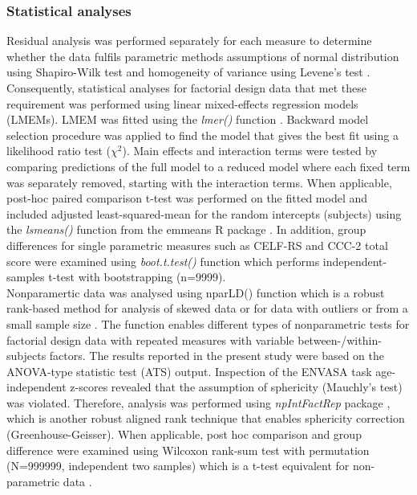 \documentclass[a4paper, twoside]{templates/ociamthesis}
\begin{document}
\hypertarget{statistical-analyses}{%
\subsubsection{Statistical analyses}\label{statistical-analyses}}

Residual analysis was performed separately for each measure to determine whether the data fulfils parametric methods assumptions of normal distribution using Shapiro-Wilk test \autocite[\emph{shapiro.test()},][]{RCore} and homogeneity of variance using Levene's test \autocite[\emph{leveneTest()};][]{carPackageR}. Consequently, statistical analyses for factorial design data that met these requirement was performed using linear mixed-effects regression models (LMEMs). LMEM was fitted using the \emph{lmer()} function \autocite[lme4 package;][]{lme4PackageR}. Backward model selection procedure was applied to find the model that gives the best fit using a likelihood ratio test (\(\chi^2\)). Main effects and interaction terms were tested by comparing predictions of the full model to a reduced model where each fixed term was separately removed, starting with the interaction terms. When applicable, post-hoc paired comparison t-test was performed on the fitted model and included adjusted least-squared-mean for the random intercepts (subjects) using the \emph{lsmeans()} function from the emmeans R package \autocite{emmeansPackageR}. In addition, group differences for single parametric measures such as CELF-RS and CCC-2 total score were examined using \emph{boot.t.test()} function \autocite[MKinfer package;][]{MKinferPackageR} which performs independent-samples t-test with bootstrapping (n=9999).\\

Nonparamertic data was analysed using nparLD() function \autocite[nparLD package;][]{nparLDPackageR} which is a robust rank-based method for analysis of skewed data or for data with outliers or from a small sample size \autocite[see][ for a good introduction on robust nonparametric techniques]{Feys2016}. The function enables different types of nonparametric tests for factorial design data with repeated measures with variable between-/within-subjects factors. The results reported in the present study were based on the ANOVA-type statistic test (ATS) output. Inspection of the ENVASA task age-independent z-scores revealed that the assumption of sphericity (Mauchly's test) was violated. Therefore, analysis was performed using \emph{npIntFactRep} package \autocite{npIntFactRepPackageR}, which is another robust aligned rank technique that enables sphericity correction (Greenhouse-Geisser). When applicable, post hoc comparison and group difference were examined using Wilcoxon rank-sum test with permutation (N=999999, independent two samples) which is a t-test equivalent for non-parametric data \autocite[\emph{coin::wilcox\_test()};][]{CoinPackageR}.
\end{document}
